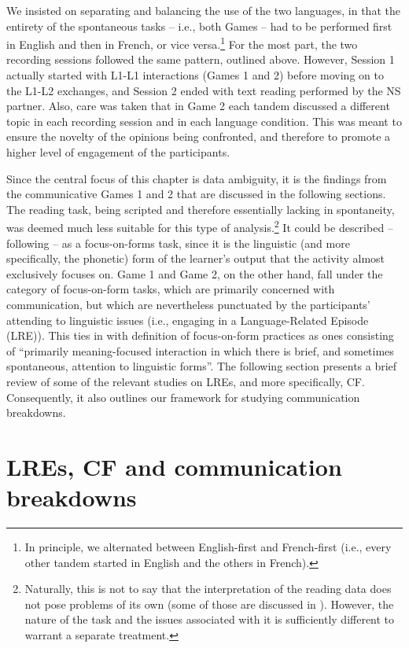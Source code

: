 \documentclass[output=paper,colorlinks,citecolor=brown,modfonts,nonflat]{../langscibook}
\begin{document}
We insisted on separating and balancing the use of the two languages, in that the entirety of the spontaneous tasks – i.e., both Games – had to be performed first in English and then in French, or vice versa.\footnote{ {In principle, we alternated between English-first and French-first (i.e., every other tandem started in English and the others in French).}} For the most part, the two recording sessions followed the same pattern, outlined above. However, Session 1 actually started with L1-L1 interactions (Games 1 and 2) before moving on to the L1-L2 exchanges, and Session 2 ended with text reading performed by the NS partner. Also, care was taken that in Game 2 each tandem discussed a different topic in each recording session and in each language condition. This was meant to ensure the novelty of the opinions being confronted, and therefore to promote a higher level of engagement of the participants.

Since the central focus of this chapter is data ambiguity, it is the findings from the communicative Games 1 and 2 that are discussed in the following sections. The reading task, being scripted and therefore essentially lacking in spontaneity, was deemed much less suitable for this type of analysis.\footnote{ {Naturally, this is not to say that the interpretation of the reading data does not pose problems of its own (some of those are discussed in \citet{HorguesScheuer2014}). However, the nature of the task and the issues associated with it is sufficiently different to warrant a separate treatment.}} It could be described – following \citet{Long1991} – as a focus-on-forms task, since it is the linguistic (and more specifically, the phonetic) form of the learner’s output that the activity almost exclusively focuses on. Game 1 and Game 2, on the other hand, fall under the category of focus-on-form tasks, which are primarily concerned with communication, but which are nevertheless punctuated by the participants’ attending to linguistic issues (i.e., engaging in a Language-Related Episode (LRE)). This ties in with  definition of focus-on-form practices as ones consisting of “primarily meaning-focused interaction in which there is brief, and sometimes spontaneous, attention to linguistic forms”. The following section presents a brief review of some of the relevant studies on LREs, and more specifically, CF. Consequently, it also outlines our framework for studying communication breakdowns.

\section{LREs, CF and communication breakdowns}\label{sec:scheuer:3}
\end{document}
